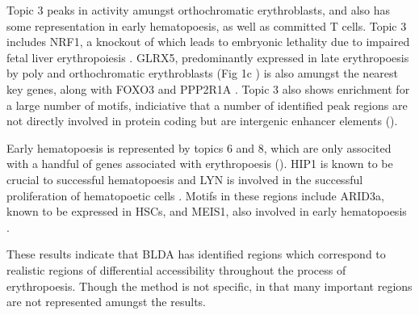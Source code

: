 Topic 3 peaks in activity amungst orthochromatic erythroblasts, and also has some representation in early hematopoesis, as well as committed T cells. Topic 3 includes NRF1, a knockout of which leads to embryonic lethality due to impaired fetal liver erythropoiesis \cite{Chen2001}. GLRX5, predominantly expressed in late erythropoesis by poly and orthochromatic erythroblasts (Fig 1c \cite{Pishesha2014}) is also amungst the nearest key genes, along with FOXO3 and PPP2R1A \cite{Mello2019}. Topic 3 also shows enrichment for a large number of motifs, indiciative that a number of identified peak regions are not directly involved in protein coding but are intergenic enhancer elements ().

Early hematopoesis is represented by topics 6 and 8, which are only associted with a handful of genes associated with erythropoesis (). HIP1 is known to be crucial to successful hematopoesis and LYN is involved in the successful proliferation of hematopoetic cells \cite{Oravecz-Wilson2004, OLaughlin-Bunner2001}. Motifs in these regions include ARID3a, known to be expressed in HSCs, and MEIS1, also involved in early hematopoesis \cite{Zeddies2014,Miller2016, Ratliff2020}. 

These results indicate that BLDA has identified regions which correspond to realistic regions of differential accessibility throughout the process of erythropoesis. Though the method is not specific, in that many important regions are not represented amungst the results.  











